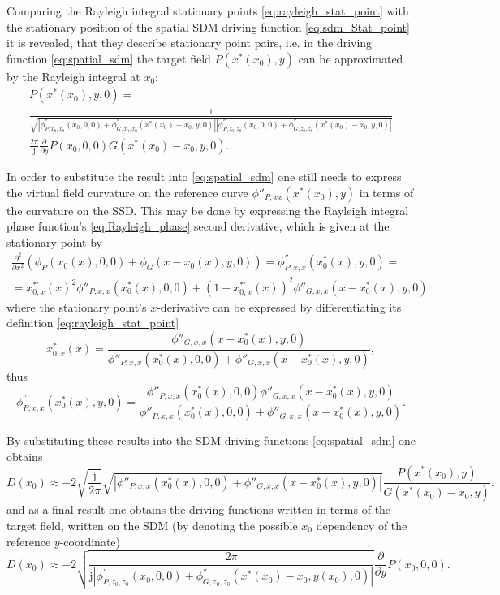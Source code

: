 \documentclass[12pt,a4paper]{article}
\newcommand{\ti}{\mathrm{j}}
\begin{document}
Comparing the Rayleigh integral stationary points \eqref{eq:rayleigh_stat_point} with the stationary position of the spatial SDM driving function \eqref{eq:sdm_Stat_point} it is revealed, that they describe stationary point pairs, i.e. in the driving function \eqref{eq:spatial_sdm} the target field $P(x^*(x_0),y)$ can be approximated by the Rayleigh integral at $x_0$:
\begin{multline}
P(x^*(x_0),y,0) = \\ \frac{1}{\sqrt{ 
\left| \phi^{''}_{P,x_0,x_0}(x_0,0,0) + \phi^{''}_{G,x_0,x_0}(x^*(x_0) - x_0,y,0) \right|
\left| \phi^{''}_{P,z_0,z_0}(x_0,0,0	) + \phi^{''}_{G,z_0,z_0}(x^*(x_0) - x_0,y,0) \right|
}}
\\
 \frac{2\pi}{\ti}  \frac{\partial}{\partial y}P(x_0,0,0) G(x^*(x_0) - x_0,y,0).
\end{multline}

In order to substitute the result into \eqref{eq:spatial_sdm} one still needs to express the virtual field curvature on the reference curve $\phi{''}_{P,xx}(x^*(x_0),y)$
in terms of the curvature on the SSD. This may be done by expressing the Rayleigh integral phase function's \eqref{eq:Rayleigh_phase} second derivative, which is given at the stationary point by
\begin{multline}
\frac{\partial^2}{\partial x^2} \left( \phi_P(x_0(x),0,0) + \phi_G(x-x_0(x),y,0) \right) = \phi_{P,x,x}^{''}( x^*_0(x),y,0 ) = \\
=   x^{*'}_{0,x}(x)^2 \phi''_{P,x,x}(x^*_0(x),0,0) + (1-x^{*'}_{0,x}(x))^2\phi''_{G,x,x	}(x-x^*_0(x),y,0)
\end{multline}
where the stationary point's $x$-derivative can be expressed by differentiating its definition \eqref{eq:rayleigh_stat_point}
\begin{equation}
x_{0,x}^{*'}(x) =  \frac{ \phi''_{G,x,x}(x- x_0^*(x),y,0) }{\phi''_{P,x,x}(x_0^*(x),0,0) + \phi''_{G,x,x}(x- x_0^*(x),y,0) },
\end{equation}
thus
\begin{equation}
\phi_{P,x,x}^{''}( x^*_0(x),y,0 )  =
\frac{ \phi''_{P,x,x}(x_0^*(x),0,0) \phi''_{G,x,x}(x-x^*_0(x),y,0) }
{\phi''_{P,x,x}(x_0^*(x),0,0) + \phi''_{G,x,x}(x- x_0^*(x),y,0) } .
\end{equation}

\vspace{3mm}
By substituting these results into the SDM driving functions \eqref{eq:spatial_sdm} one obtains
\begin{equation}
D(x_0) \approx -2
\sqrt{\frac{\ti}{2\pi}} 
\sqrt{ \left| \phi''_{P,x,x}(x_0^*(x),0,0) + \phi''_{G,x,x}(x- x_0^*(x),y,0) 	\right|}
\frac{P(x^*(x_0),y)}{G(x^*(x_0) - x_0,y)}.
\end{equation}
and as a final result one obtains the driving functions written in terms of the target field, written on the SDM (by denoting the possible $x_0$ dependency of the reference $y$-coordinate)
\begin{equation}
D(x_0) \approx -2
\sqrt{ \frac{2\pi}{\ti \left| \phi^{''}_{P,z_0,z_0}(x_0,0,0	) + \phi^{''}_{G,z_0,z_0}(x^*(x_0) - x_0,y(x_0),0) \right|}}
 \frac{\partial}{\partial y}P(x_0,0,0).
\label{eq:SDM_rayleigh}
\end{equation}
\end{document}

